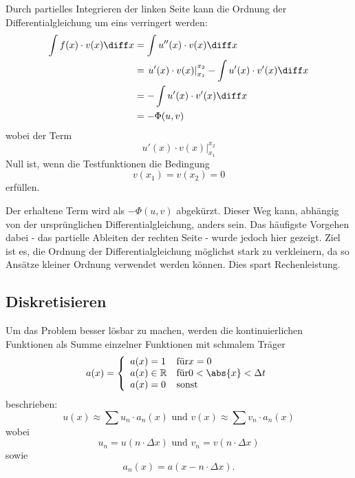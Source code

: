 Durch partielles Integrieren der linken Seite kann die Ordnung der Differentialgleichung um eins verringert werden:
\begin{align}
    \int f(x) \cdot v(x) \diff x &= \int u''(x) \cdot v(x) \diff x \\
                                 &= \left. u'(x) \cdot v(x) \right|_{x_1}^{x_2} - \int u'(x) \cdot v'(x) \diff x \\
                                 &= - \int u'(x) \cdot v'(x) \diff x \\
                                 &= - \Phi(u, v)
\end{align}
wobei der Term
\begin{equation}
    \left. u'(x) \cdot v(x) \right|_{x_1}^{x_2}
\end{equation}
Null ist, wenn die Testfunktionen die Bedingung
\begin{equation}
    v(x_1) = v(x_2) = 0
\end{equation}
erfüllen. %

Der erhaltene Term wird als $-\Phi(u, v)$ abgekürzt.
Dieser Weg kann, abhängig von der ursprünglichen Differentialgleichung, anders sein.
Das häufigste Vorgehen dabei - das partielle Ableiten der rechten Seite - wurde jedoch hier gezeigt.
Ziel ist es, die Ordnung der Differentialgleichung möglichst stark zu verkleinern, da so Ansätze kleiner Ordnung verwendet werden können.
Dies spart Rechenleistung.


\subsection{Diskretisieren\label{fem:1d:diskretisieren}}
Um das Problem besser lösbar zu machen, werden die kontinuierlichen Funktionen als Summe einzelner Funktionen mit schmalem Träger 
\begin{equation}
    a(x) = \left\{ \begin{array} {ll}
        a(x) = 1            & \mbox{für} x = 0 \\
        a(x) \in \mathbb{R} & \mbox{für} 0 < \abs{x} < \Delta t \\
        a(x) = 0            & \mbox{sonst} 
    \end{array}\right.
\end{equation}
beschrieben:
\begin{equation}
    u(x) \approx \sum{u_n \cdot a_n(x)} \mbox{ und } v(x) \approx \sum{v_n \cdot a_n(x)}
\end{equation}
wobei 
\begin{equation}
    u_n = u(n \cdot \Delta x) \mbox{ und } v_n = v(n \cdot \Delta x)
\end{equation}
sowie 
\begin{equation}
    a_n(x) = a(x - n \cdot \Delta x).
\end{equation}

